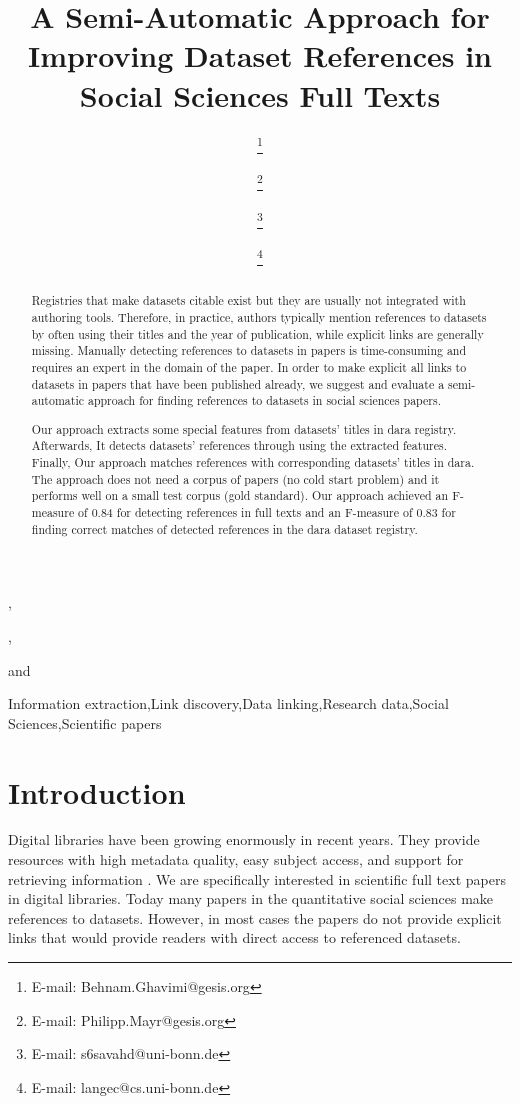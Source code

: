 \documentclass{IOS-Book-Article}
\newcommand{\dara}{\textsf{da\textbar ra}}
\begin{document}
\pagestyle{headings}
\def\thepage{}

\begin{frontmatter}
\title{A Semi-Automatic Approach for Improving Dataset References in Social Sciences Full Texts}

\author[A,B]{ 
\thanks{E-mail: Behnam.Ghavimi@gesis.org}},
\author[A]{ 
\thanks{E-mail: Philipp.Mayr@gesis.org}},
\author[B]{ 
\thanks{E-mail: s6savahd@uni-bonn.de}}
and
\author[B,C]{  
\thanks{E-mail: langec@cs.uni-bonn.de}}

\address[A]{GESIS – Leibniz Institute for the Social Sciences}
\address[B]{University of Bonn}
\address[C]{Fraunhofer IAIS}
\begin{abstract}
Registries that make datasets citable exist but they are usually not integrated with authoring tools. Therefore, in practice, authors typically mention references to datasets by often using their titles and the year of publication, while explicit links are generally missing.
Manually detecting references to datasets in papers is time-consuming and requires an expert in the domain of the paper. In order to make explicit all links to datasets in papers that have been published already, we suggest and evaluate a semi-automatic approach for finding references to datasets in social sciences papers.

Our approach extracts some special features from datasets' titles in {\dara} registry. Afterwards, It detects datasets' references through using the extracted features. Finally, Our approach matches references with corresponding datasets' titles in {\dara}.
The approach does not need a corpus of papers (no cold start problem) and it performs well on a small test corpus (gold standard). Our approach achieved an F-measure of 0.84 for detecting references in full texts and an F-measure of 0.83 for finding correct matches of detected references in the {\dara} dataset registry.
\end{abstract}

\begin{keyword}
Information extraction\sep Link discovery\sep Data linking\sep Research data\sep Social Sciences\sep Scientific papers
\end{keyword}
\end{frontmatter}
\section{Introduction}
Digital libraries have been growing enormously in recent years.
They provide resources with high metadata quality, easy subject access, and support for retrieving information \citep{Hienert2015}. 
We are specifically interested in scientific full text papers in digital libraries.
Today many papers in the quantitative social sciences make references to datasets. 
However, in most cases the papers do not provide explicit links that would provide readers with direct access to referenced datasets. 
\end{document}

